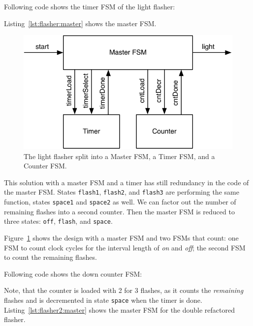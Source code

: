 \documentclass[%
    10pt,
    headinclude, footexclude,
    openright, %
    notitlepage,
    cleardoubleempty,
    headsepline,
    pointlessnumbers,
    bibtotoc, idxtotoc,
    ]{scrbook}
\newcommand{\code}[1]{{\small{\texttt{#1}}}}
\newcommand{\scale}{0.7}
\begin{document}
\noindent Following code shows the timer FSM of the light flasher:



\noindent Listing~\ref{lst:flasher:master} shows the master FSM.


\begin{figure}
  \centering
  \includegraphics[scale=\scale]{figures/flasher2}
  \caption{The light flasher split into a Master FSM, a Timer FSM, and a Counter FSM.}
  \label{fig:flasher2}
\end{figure}

This solution with a master FSM and a timer has still redundancy in the code
of the master FSM. States \code{flash1}, \code{flash2}, and \code{flash3}
are performing the same function, states \code{space1} and \code{space2} as well.
We can factor out the number of remaining flashes into a second counter.
Then the master FSM is reduced to three states: \code{off}, \code{flash},
and \code{space}.

Figure~\ref{fig:flasher2} shows the design with a master FSM and two FSMs
that count: one FSM to count clock cycles for the interval length of \emph{on}
and \emph{off}; the second FSM to count the remaining flashes.

Following code shows the down counter FSM:


\noindent Note, that the counter is loaded with 2 for 3 flashes, as it counts the
\emph{remaining} flashes and is decremented in state \code{space} when the timer
is done. Listing~\ref{lst:flasher2:master} shows the master FSM for the double refactored flasher.
\end{document}
